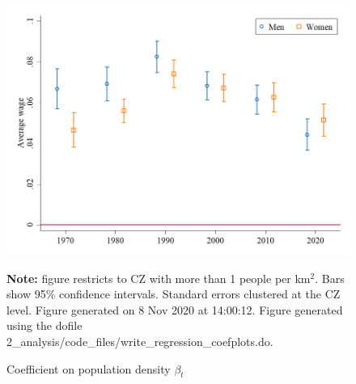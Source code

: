 \begin{figure}[!h]
\centering
\caption{Coefficient on population density $ \beta_t $}
\includegraphics[width=1\textwidth]{../2_analysis/output/figures/premium_by_gender_full_time}
\par \begin{minipage}[h]{\textwidth}{\tiny\textbf{Note:} figure restricts to CZ with more than 1 people per km$^2$. Bars show 95\% confidence intervals. Standard errors clustered at the CZ level. Figure generated on  8 Nov 2020 at 14:00:12. Figure generated using the dofile 2\_analysis/code\_files/write\_regression\_coefplots.do.}\end{minipage}
\end{figure}
